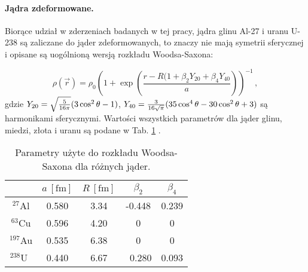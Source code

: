 \documentclass[a4paper,12pt]{article}
\begin{document}
\paragraph{Jądra zdeformowane.}
Biorące udział w zderzeniach badanych w tej pracy, jądra glinu Al-27 i uranu U-238 są zaliczane do jąder zdeformowanych, to znaczy nie mają symetrii sferycznej i opisane są uogólnioną wersją rozkładu Woodsa-Saxona:

\begin{equation}
\rho(\vec{r})=\rho_0\left({1+\exp\left(\frac{r-R(1+\beta_2Y_{20}+\beta_4Y_{40}}{a}\right)}\right)^{-1}\,,
\end{equation}
gdzie $Y_{20}=\sqrt{ 5\over{16\pi}}(3\cos^{2}\theta-1)$, $Y_{40}={ 3\over {16\sqrt{\pi}}}(35\cos^{4}\theta-30\cos^{2}\theta+3)$ są harmonikami sferycznymi. Wartości wszystkich parametrów dla jąder glinu, miedzi, złota i uranu są podane w Tab. \ref{table0}  \cite{Loizides:2014vua,DeJager:1987qc}.

\begin{table}[h!]
\begin{center}
\begin{tabular}{|c|c|c|c|c|} \hline
 & $a~[\mathrm{fm}]$ & $R~[\mathrm{fm}]$ & $\beta_2$ & $\beta_4$ \\ \hline
$^{27 }\!$Al     & 0.580 & 3.34 & -0.448 & 0.239 \\ \hline
$^{63 }  $Cu     & 0.596 & 4.20 &  0     &  0    \\ \hline
$^{197}\!$Au     & 0.535 & 6.38 &  0     &  0    \\ \hline
$^{238}  $U$~~$  & 0.440 & 6.67 & ~0.280 & 0.093 \\ \hline
\end{tabular}
\caption{\label{table0} 
Parametry użyte do rozkładu Woodsa-Saxona dla różnych jąder.}
\end{center}
\end{table}
\end{document}
